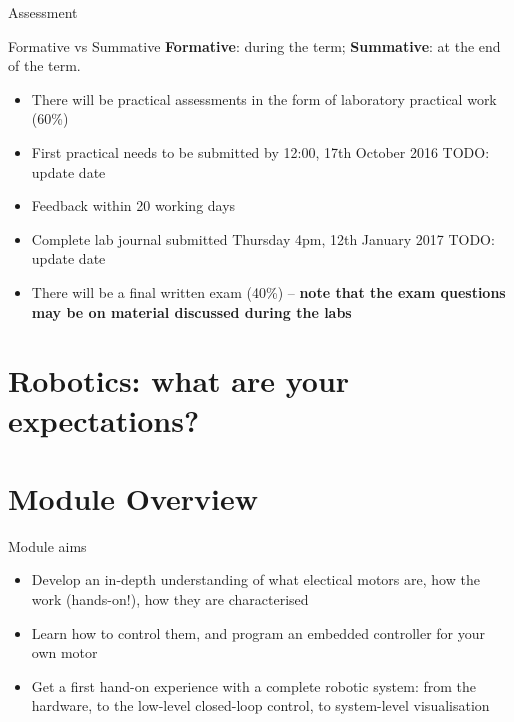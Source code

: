 \documentclass[compress]{beamer}
\begin{document}
\begin{frame}{Assessment}
    \begin{exampleblock}{Formative vs Summative}
        \textbf{Formative}: during the term; \textbf{Summative}: at the end of
        the term.
    \end{exampleblock}

    \begin{itemize}
        \item There will be practical assessments in the form of laboratory
            practical work (60\%)
        \item First practical needs to be submitted by 12:00, 17th October 2016
            TODO: update date
        \item Feedback within 20 working days
        \item Complete lab journal submitted Thursday 4pm, 12th January 2017
            TODO: update date
        \item There will be a final written exam (40\%) -- \textbf{note that the
            exam questions may be on material discussed during the labs}
    \end{itemize}

\end{frame}


\section{Robotics: what are your expectations?}


\section{Module Overview}



\begin{frame}{Module aims}
    \begin{itemize}
        \item<+-> Develop an in-depth understanding of what electical motors are,
            how the work (hands-on!), how they are characterised
        \item<+-> Learn how to control them, and program an embedded controller
            for your own motor
        \item<+-> Get a first hand-on experience with a complete robotic system:
            from the hardware, to the low-level closed-loop control, to
            system-level visualisation
    \end{itemize}
\end{frame}
\end{document}
